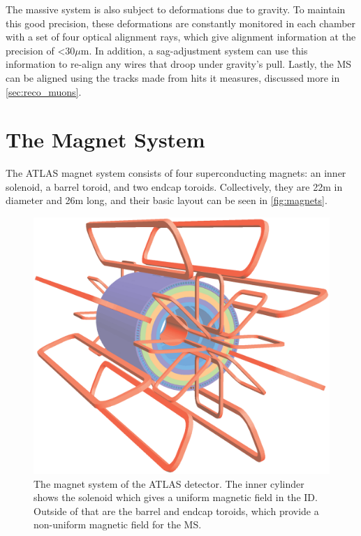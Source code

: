 The massive system is also subject to deformations due to gravity. To maintain this good precision, these deformations are constantly monitored in each chamber with a set of four optical alignment rays, which give alignment information at the precision of <30$\mu$m. In addition, a sag-adjustment system can use this information to re-align any wires that droop under gravity's pull. Lastly, the \ac{MS} can be aligned using the tracks made from hits it measures, discussed more in \autoref{sec:reco_muons}.

\section{The Magnet System}
\label{sec:magnets}

The ATLAS magnet system consists of four superconducting magnets: an inner solenoid, a barrel toroid, and two endcap toroids. Collectively, they are 22m in diameter and 26m long, and their basic layout can be seen in \autoref{fig:magnets}.

\begin{centering}
\begin{figure}[bth]
\myfloatalign
\includegraphics[width=.90\linewidth]{figures/atlas/ATLcoilGeom.eps}
\caption{The magnet system of the ATLAS detector. The inner cylinder shows the solenoid which gives a uniform magnetic field in the \ac{ID}. Outside of that are the barrel and endcap toroids, which provide a non-uniform magnetic field for the \ac{MS}.}
\label{fig:magnets}
\end{figure}
\end{centering}

